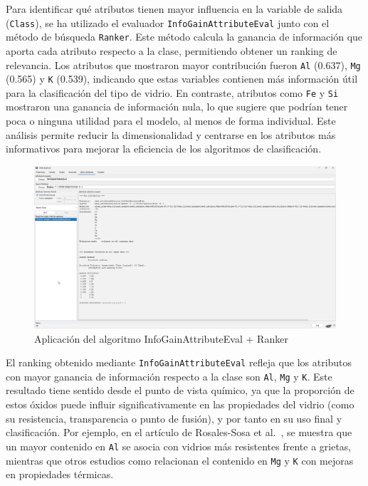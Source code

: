 \documentclass{article}
\begin{document}
Para identificar qué atributos tienen mayor influencia en la variable de salida (\texttt{Class}), se ha utilizado el evaluador \texttt{InfoGainAttributeEval} junto con el método de búsqueda \texttt{Ranker}. Este método calcula la ganancia de información que aporta cada atributo respecto a la clase, permitiendo obtener un ranking de relevancia. Los atributos que mostraron mayor contribución fueron \texttt{Al} (0.637), \texttt{Mg} (0.565) y \texttt{K} (0.539), indicando que estas variables contienen más información útil para la clasificación del tipo de vidrio. En contraste, atributos como \texttt{Fe} y \texttt{Si} mostraron una ganancia de información nula, lo que sugiere que podrían tener poca o ninguna utilidad para el modelo, al menos de forma individual. Este análisis permite reducir la dimensionalidad y centrarse en los atributos más informativos para mejorar la eficiencia de los algoritmos de clasificación.\\

\begin{figure}[!ht]
    \centering
    \includegraphics[width=1\linewidth]{Imágenes/InfoGainAttributeEval.png}
    \caption{Aplicación del algoritmo InfoGainAttributeEval + Ranker}
    \label{fig:info-gain}
\end{figure}

El ranking obtenido mediante \texttt{InfoGainAttributeEval} refleja que los atributos con mayor ganancia de información respecto a la clase son \texttt{Al}, \texttt{Mg} y \texttt{K}. Este resultado tiene sentido desde el punto de vista químico, ya que la proporción de estos óxidos puede influir significativamente en las propiedades del vidrio (como su resistencia, transparencia o punto de fusión), y por tanto en su uso final y clasificación. Por ejemplo, en el artículo de Rosales-Sosa et al.~\cite{Rosales-Sosa2016}, se muestra que un mayor contenido en \texttt{Al} se asocia con vidrios más resistentes frente a grietas, mientras que otros estudios como \cite{nishida1990correlation} relacionan el contenido en \texttt{Mg} y \texttt{K} con mejoras en propiedades térmicas.\\
\end{document}
